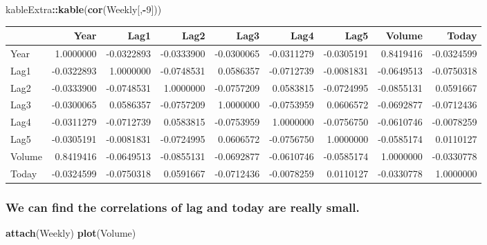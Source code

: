 \documentclass[]{article}
\newenvironment{Shaded}{\begin{snugshade}}{\end{snugshade}}
\newcommand{\KeywordTok}[1]{\textcolor[rgb]{0.13,0.29,0.53}{\textbf{#1}}}
\newcommand{\DecValTok}[1]{\textcolor[rgb]{0.00,0.00,0.81}{#1}}
\newcommand{\OperatorTok}[1]{\textcolor[rgb]{0.81,0.36,0.00}{\textbf{#1}}}
\newcommand{\NormalTok}[1]{#1}
\begin{document}
\begin{Shaded}
\begin{Highlighting}[]
\NormalTok{kableExtra}\OperatorTok{::}\KeywordTok{kable}\NormalTok{(}\KeywordTok{cor}\NormalTok{(Weekly[,}\OperatorTok{-}\DecValTok{9}\NormalTok{]))}
\end{Highlighting}
\end{Shaded}

\begin{tabular}{l|r|r|r|r|r|r|r|r}
\hline
  & Year & Lag1 & Lag2 & Lag3 & Lag4 & Lag5 & Volume & Today\\
\hline
Year & 1.0000000 & -0.0322893 & -0.0333900 & -0.0300065 & -0.0311279 & -0.0305191 & 0.8419416 & -0.0324599\\
\hline
Lag1 & -0.0322893 & 1.0000000 & -0.0748531 & 0.0586357 & -0.0712739 & -0.0081831 & -0.0649513 & -0.0750318\\
\hline
Lag2 & -0.0333900 & -0.0748531 & 1.0000000 & -0.0757209 & 0.0583815 & -0.0724995 & -0.0855131 & 0.0591667\\
\hline
Lag3 & -0.0300065 & 0.0586357 & -0.0757209 & 1.0000000 & -0.0753959 & 0.0606572 & -0.0692877 & -0.0712436\\
\hline
Lag4 & -0.0311279 & -0.0712739 & 0.0583815 & -0.0753959 & 1.0000000 & -0.0756750 & -0.0610746 & -0.0078259\\
\hline
Lag5 & -0.0305191 & -0.0081831 & -0.0724995 & 0.0606572 & -0.0756750 & 1.0000000 & -0.0585174 & 0.0110127\\
\hline
Volume & 0.8419416 & -0.0649513 & -0.0855131 & -0.0692877 & -0.0610746 & -0.0585174 & 1.0000000 & -0.0330778\\
\hline
Today & -0.0324599 & -0.0750318 & 0.0591667 & -0.0712436 & -0.0078259 & 0.0110127 & -0.0330778 & 1.0000000\\
\hline
\end{tabular}

\subsubsection{We can find the correlations of lag and today are really
small.}\label{we-can-find-the-correlations-of-lag-and-today-are-really-small.}

\begin{Shaded}
\begin{Highlighting}[]
\KeywordTok{attach}\NormalTok{(Weekly)}
\KeywordTok{plot}\NormalTok{(Volume)}
\end{Highlighting}
\end{Shaded}
\end{document}
